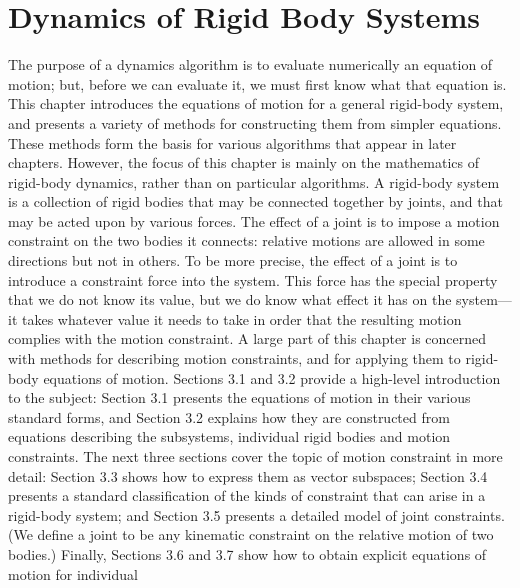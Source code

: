 \chapter{Dynamics of Rigid Body Systems}
\label{chap:3}
The purpose of a dynamics algorithm is to evaluate numerically an equation of motion; but, before we can evaluate it, we must first know what that equation is. This chapter introduces the equations of motion for a general rigid-body system, and presents a variety of methods for constructing them from simpler equations. These methods form the basis for various algorithms that appear in later chapters. However, the focus of this chapter is mainly on the mathematics of rigid-body dynamics, rather than on particular algorithms. A rigid-body system is a collection of rigid bodies that may be connected together by joints, and that may be acted upon by various forces. The effect of a joint is to impose a motion constraint on the two bodies it connects: relative motions are allowed in some directions but not in others. To be more precise, the effect of a joint is to introduce a constraint force into the system. This force has the special property that we do not know its value, but we do know what effect it has on the system—it takes whatever value it needs to take in order that the resulting motion complies with the motion constraint. A large part of this chapter is concerned with methods for describing motion constraints, and for applying them to rigid-body equations of motion. Sections 3.1 and 3.2 provide a high-level introduction to the subject: Section 3.1 presents the equations of motion in their various standard forms, and Section 3.2 explains how they are constructed from equations describing the subsystems, individual rigid bodies and motion constraints. The next three sections cover the topic of motion constraint in more detail: Section 3.3 shows how to express them as vector subspaces; Section 3.4 presents a standard classification of the kinds of constraint that can arise in a rigid-body system; and Section 3.5 presents a detailed model of joint constraints. (We define a joint to be any kinematic constraint on the relative motion of two bodies.) Finally, Sections 3.6 and 3.7 show how to obtain explicit equations of motion for individual

